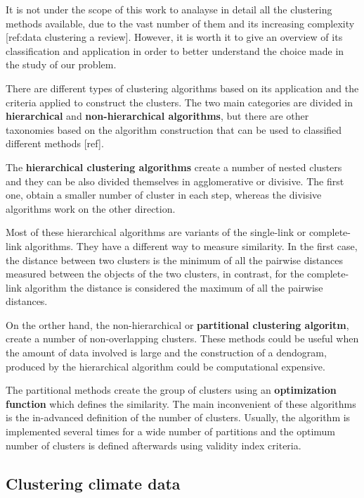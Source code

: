 It is not under the scope of this work to analayse in detail all the clustering methods available, due to the vast number of them and its increasing complexity [ref:data clustering a review]. However, it is worth it to give an overview of its classification and application in order to better understand the choice made in the study of our problem.

There are different types of clustering algorithms based on its application and the criteria applied to construct the clusters. The two main categories are divided in \textbf{hierarchical} and \textbf{non-hierarchical algorithms}, but there are other taxonomies based on the algorithm construction that can be used to classified different methods [ref].

The \textbf{hierarchical clustering algorithms} create a number of nested clusters and they can be also divided themselves in agglomerative or divisive. The first one, obtain a smaller number of cluster in each step, whereas the divisive algorithms work on the other direction.

Most of these hierarchical algorithms are variants of the single-link or complete-link algorithms. They have a different way to measure similarity. In the first case, the distance between two clusters is the minimum of all the pairwise distances measured between the objects of the two clusters, in contrast, for the complete-link algorithm the distance is considered the maximum of all the pairwise distances.

On the orther hand, the non-hierarchical or \textbf{partitional clustering algoritm}, create a number of non-overlapping clusters. These methods could be useful when the amount of data involved is large and the construction of a dendogram, produced by the hierarchical algorithm could be computational expensive.

The partitional methods create the group of clusters using an \textbf{optimization function} which defines the similarity. The main inconvenient of these algorithms is the in-advanced definition of the number of clusters. Usually, the algorithm is implemented several times for a wide number of partitions and the optimum number of clusters is defined afterwards using validity index criteria.



\subsection{Clustering climate data}

